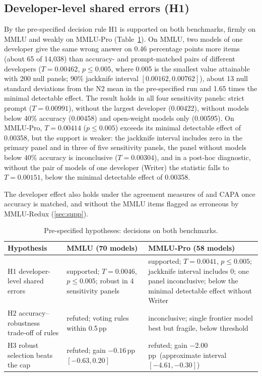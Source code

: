 \documentclass[preprint,12pt,authoryear]{elsarticle}
\newcommand{\pp}{\,pp}
\begin{document}
\subsection{Developer-level shared errors (H1)}
By the pre-specified decision rule H1 is supported on both benchmarks, firmly on MMLU and weakly on MMLU-Pro (Table~\ref{tab:hyp}). On MMLU, two models of one developer give the same wrong answer on 0.46 percentage points more items (about 65 of 14,038) than accuracy- and prompt-matched pairs of different developers ($T = 0.00462$, $p \le 0.005$, where 0.005 is the smallest value attainable with 200 null panels; 90\% jackknife interval $[0.00162, 0.00762]$), about 13 null standard deviations from the N2 mean in the pre-specified run and 1.65 times the minimal detectable effect. The result holds in all four sensitivity panels: strict prompt ($T=0.00991$), without the largest developer (0.00422), without models below 40\% accuracy (0.00458) and open-weight models only (0.00595). On MMLU-Pro, $T=0.00414$ ($p \le 0.005$) exceeds its minimal detectable effect of 0.00358, but the support is weaker: the jackknife interval includes zero in the primary panel and in three of five sensitivity panels, the panel without models below 40\% accuracy is inconclusive ($T=0.00304$), and in a post-hoc diagnostic, without the pair of models of one developer (Writer) the statistic falls to $T=0.00151$, below the minimal detectable effect of 0.00358.

The developer effect also holds under the agreement measures of \citet{kim2025correlated} and CAPA \citep{goel2025great} once accuracy is matched, and without the MMLU items flagged as erroneous by MMLU-Redux (\ref{sec:supp}).

\begin{table}[!htbp]
\centering
\caption{Pre-specified hypotheses: decisions on both benchmarks.}
\label{tab:hyp}
\small
\begin{tabular}{@{}p{3.4cm}p{4.6cm}p{4.6cm}@{}}
\toprule
Hypothesis & MMLU (70 models) & MMLU-Pro (58 models) \\
\midrule
H1 developer-level shared errors & supported; $T=0.0046$, $p\le0.005$; robust in 4 sensitivity panels & supported; $T=0.0041$, $p\le0.005$; jackknife interval includes 0; one panel inconclusive; below the minimal detectable effect without Writer \\
H2 accuracy--robustness trade-off of rules & refuted; voting rules within 0.5\pp & inconclusive; single frontier model best but fragile, below threshold \\
H3 robust selection beats the cap & refuted; gain $-0.16$\pp\ $[-0.63, 0.20]$ & refuted; gain $-2.00$\pp\ (approximate interval $[-4.61, -0.30]$) \\
\bottomrule
\end{tabular}
\end{table}
\end{document}
